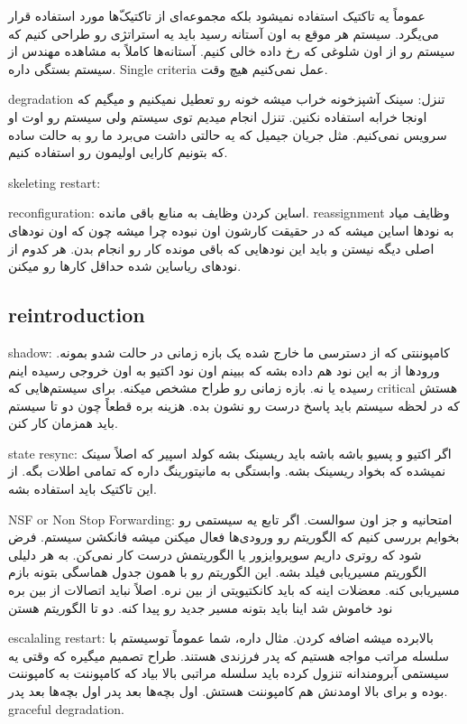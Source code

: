 عموماً یه تاکتیک استفاده نمیشود بلکه مجموعه‌ای از تاکتیک‌ّها مورد استفاده قرار
می‌یگرد. سیستم هر موقع به اون آستانه رسید باید یه استراتژی رو طراحی کنیم که
سیستم رو از اون شلوغی که رخ داده خالی کنیم. آستانه‌ها کاملاً به مشاهده مهندس از
سیستم بستگی داره. Single criteria عمل نمی‌کنیم هیچ وقت.

degradation تنزل:
سینک آشپزخونه خراب میشه خونه رو تعطیل نمیکنیم و میگیم که اونجا خرابه استفاده
نکنین. تنزل انجام میدیم توی سیستم ولی سیستم رو اوت او سرویس نمی‌کنیم. مثل جریان
جیمیل که یه حالتی داشت می‌برد ما رو به حالت ساده که بتونیم کارایی اولیمون رو
استفاده کنیم.

skeleting restart:

reconfiguration: اساین کردن وظایف به منابع باقی مانده. reassignment وظایف میاد
به نود‌ها اساین میشه که در حقیقت کارشون اون نبوده چرا میشه چون که اون نود‌های
اصلی دیگه نیستن و باید این نود‌هایی که باقی مونده کار رو انجام بدن. هر کدوم از
نود‌های ریاساین شده حداقل کار‌ها رو میکنن.

\subsection{reintroduction}

shadow: کامپوننتی که از دسترسی ما خارج شده یک بازه زمانی در حالت شدو بمونه.
ورود‌ها از به این نود هم داده بشه که ببینم اون نود اکتیو به اون خروجی رسیده اینم
رسیده یا نه. بازه زمانی رو طراح مشخص میکنه. برای سیستم‌هایی که critical هستش که
در لحظه سیستم باید پاسخ درست رو نشون بده. هزینه بره قطعاً چون دو تا سیستم باید
همزمان کار کنن.

state resync: اگر اکتیو و پسیو باشه باشه باید ریسینک بشه کولد اسپیر که اصلاً
سینک نمیشده که بخواد ریسینک بشه. وابستگی به مانیتورینگ داره که تمامی اطلات بگه.
از این تاکتیک باید استفاده بشه.

NSF or Non Stop Forwarding: امتحانیه و جز اون سوالست. اگر تابع یه سیستمی رو
بخوایم بررسی کنیم که الگوریتم رو ورودی‌ها فعال میکنن میشه فانکشن سیستم. فرض شود
که روتری داریم سوپروایزور یا الگوریتمش درست کار نمی‌کن. به هر دلیلی الگوریتم
مسیریابی فیلد بشه. این الگوریتم رو با همون جدول هماسگی بتونه بازم مسیریابی کنه.
معضلات اینه که باید کانکتیویتی از بین نره. اصلاً نباید اتصالات از بین بره نود
خاموش شد اینا باید بتونه مسیر جدید رو پیدا کنه. دو تا الگوریتم هستن 

escalaling restart: بالابرده میشه اضافه کردن. مثال داره، شما عموماً توسیستم با
سلسله مراتب مواجه هستیم که پدر فرزندی هستند. طراح تصمیم میگیره که وقتی یه سیستمی
آبرومندانه تنزول کرده باید سلسله مراتبی بالا بیاد که کامپوننت به کامپوننت بوده و
برای بالا اومدنش هم کامپوننت هستش. اول بچه‌ها بعد پدر اول بچه‌ها بعد پدر.
graceful degradation.

